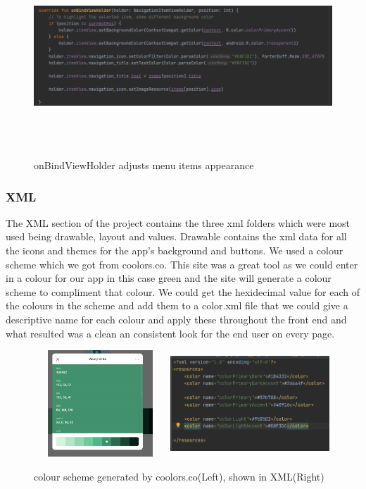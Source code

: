 \begin{figure}[H]
    \centering
    \includegraphics[width=14cm, height = 7.5cm]{img/poistion_code.PNG}
    \caption{onBindViewHolder adjusts menu items appearance}
    \label{fig:altas config}
\end{figure}

\subsubsection{XML}
The XML section of the project contains the three xml folders which were most used being drawable, layout and values. Drawable contains the xml data for all the icons and themes for the app's background and buttons. We used a colour scheme which we got from coolors.co. This site was a great tool as we could enter in a colour for our app in this case green and the site will generate a colour scheme to compliment that colour. We could get the hexidecimal value for each of the colours in the scheme and add them to a color.xml file that we could give a descriptive name for each colour and apply these throughout the front end and what resulted was a clean an consistent look for the end user on every page.
\begin{figure}[H]
    \centering
    \includegraphics[width=5cm, height = 4cm]{img/colour_pallete.PNG}
     \includegraphics[width=6cm, height = 4cm]{img/colors_xml_values.PNG}
    \caption{colour scheme generated by coolors.co(Left), shown in XML(Right)}
    \label{fig:altas config}
\end{figure}

